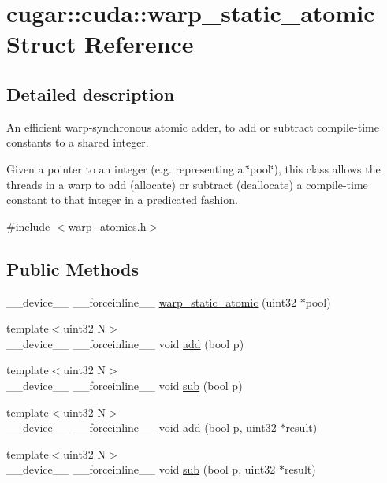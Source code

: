 \hypertarget{structcugar_1_1cuda_1_1warp__static__atomic}{}\section{cugar\+:\+:cuda\+:\+:warp\+\_\+static\+\_\+atomic Struct Reference}
\label{structcugar_1_1cuda_1_1warp__static__atomic}


\subsection{Detailed description}
An efficient warp-\/synchronous atomic adder, to add or subtract compile-\/time constants to a shared integer.

Given a pointer to an integer (e.\+g. representing a \char`\"{}pool\char`\"{}), this class allows the threads in a warp to add (allocate) or subtract (deallocate) a compile-\/time constant to that integer in a predicated fashion. 

{\ttfamily \#include $<$warp\+\_\+atomics.\+h$>$}

\subsection*{Public Methods}
\begin{DoxyCompactItemize}
\item 
\+\_\+\+\_\+device\+\_\+\+\_\+ \+\_\+\+\_\+forceinline\+\_\+\+\_\+ \hyperlink{structcugar_1_1cuda_1_1warp__static__atomic_a75857fc958928db43b9f4c402fdbbfe8}{warp\+\_\+static\+\_\+atomic} (uint32 $\ast$pool)
\item 
{\footnotesize template$<$uint32 N$>$ }\\\+\_\+\+\_\+device\+\_\+\+\_\+ \+\_\+\+\_\+forceinline\+\_\+\+\_\+ void \hyperlink{structcugar_1_1cuda_1_1warp__static__atomic_a513882c6d2adc46e4f5f3c71ba48b8b8}{add} (bool p)
\item 
{\footnotesize template$<$uint32 N$>$ }\\\+\_\+\+\_\+device\+\_\+\+\_\+ \+\_\+\+\_\+forceinline\+\_\+\+\_\+ void \hyperlink{structcugar_1_1cuda_1_1warp__static__atomic_ade9ab486b4b61d7e2d95f5818a3698ab}{sub} (bool p)
\item 
{\footnotesize template$<$uint32 N$>$ }\\\+\_\+\+\_\+device\+\_\+\+\_\+ \+\_\+\+\_\+forceinline\+\_\+\+\_\+ void \hyperlink{structcugar_1_1cuda_1_1warp__static__atomic_a8acc0f476745c3457b52d22fa684432f}{add} (bool p, uint32 $\ast$result)
\item 
{\footnotesize template$<$uint32 N$>$ }\\\+\_\+\+\_\+device\+\_\+\+\_\+ \+\_\+\+\_\+forceinline\+\_\+\+\_\+ void \hyperlink{structcugar_1_1cuda_1_1warp__static__atomic_a1e90e3667c88ca0de2e7ca854d9c79d2}{sub} (bool p, uint32 $\ast$result)
\end{DoxyCompactItemize}
